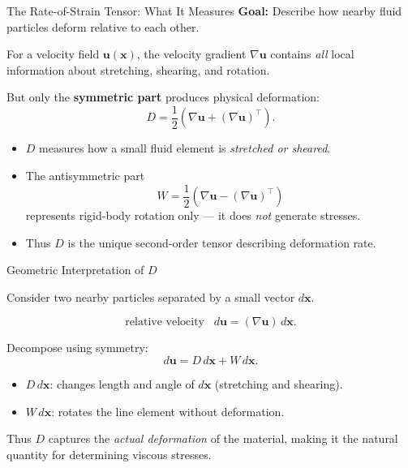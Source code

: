 \documentclass[aspectratio=169]{beamer}
\begin{document}
\begin{frame}{The Rate-of-Strain Tensor: What It Measures}
\small
\textbf{Goal:} Describe how nearby fluid particles deform relative to each other.

\medskip

For a velocity field $\mathbf{u}(\mathbf{x})$, the velocity gradient $\nabla \mathbf{u}$
contains \emph{all} local information about stretching, shearing, and rotation.

\medskip

But only the \textbf{symmetric part} produces physical deformation:
\[
D = \frac12\!\left( \nabla \mathbf{u} + (\nabla \mathbf{u})^{\!\top} \right).
\]

\begin{itemize}
\item $D$ measures how a small fluid element is \emph{stretched or sheared}.
\item The antisymmetric part
\[
W = \frac12\!\left( \nabla\mathbf{u} - (\nabla\mathbf{u})^{\!\top} \right)
\]
represents rigid-body rotation only — it does \emph{not} generate stresses.
\item Thus $D$ is the unique second-order tensor describing deformation rate.
\end{itemize}

\end{frame}

\begin{frame}{Geometric Interpretation of $D$}

Consider two nearby particles separated by a small vector $d\mathbf{x}$.

\[
\text{relative velocity} \;\;\; d\mathbf{u} = (\nabla \mathbf{u})\, d\mathbf{x}.
\]

Decompose using symmetry:
\[
d\mathbf{u}
= D\,d\mathbf{x} + W\,d\mathbf{x}.
\]

\begin{itemize}
\item $D\,d\mathbf{x}$: changes length and angle of $d\mathbf{x}$  
      (stretching and shearing).
\item $W\,d\mathbf{x}$: rotates the line element without deformation.
\end{itemize}

\vspace{0.2cm}

Thus $D$ captures the \emph{actual deformation} of the material, making it
the natural quantity for determining viscous stresses.

\end{frame}
\end{document}
